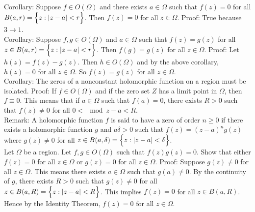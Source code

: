 \documentclass[12pt]{article}
\begin{document}
Corollary: Suppose $f \in O(\Omega)$ and there exists $a \in \Omega$ such that $f(z) = 0$ for all $B(a,r) = \Big\{ z : \abs{z-a} < r \Big\}$. Then $f(z) = 0$ for all $z \in \Omega$. Proof: True because $3\to1$. \\
Corollary: Suppose $f,g \in O(\Omega)$ and $a \in \Omega$ such that $f(z) = g(z)$ for all $z \in B(a,r) = \Big\{ z: \abs{z-a} < r \Big\}$. Then $f(g) = g(z)$ for all $z \in \Omega$. Proof: Let $h(z) = f(z) - g(z)$. Then $h \in O(\Omega)$ and by the above corollary, $h(z) = 0$ for all $z \in \Omega$. So $f(z) = g(z)$ for all $z \in \Omega$. \\
Corollary: The zeros of a nonconstant holomorphic function on a region must be isolated. Proof: If $f \in O(\Omega)$ and if the zero set $Z$ has a limit point in $\Omega$, then $f \equiv 0$. This means that if $a \in \Omega$ such that $f(a) = 0$, there exists $R > 0$ such that $f(z) \neq 0$ for all $0 < \mod{z-a} < R$. \\
Remark: A holomorphic function $f$ is said to have a zero of order $n \geq 0$ if there exists a holomorphic function $g$ and $a\delta > 0$ such that $f(z) = (z-a)^ng(z)$ where $g(z) \neq 0$ for all $z \in B(a,\delta) = \Big\{ z: \abs{z-a} < \delta \Big\}$. \\
Let $\Omega$ be a region. Let $f,g \in O(\Omega)$ such that $f(z)g(z) = 0$. Show that either $f(z) = 0$ for all $z \in \Omega$ or $g(z) = 0$ for all $z \in \Omega$. Proof: Suppose $g(z) \neq 0$ for all $z \in \Omega$. This means there exists $a \in \Omega$ such that $g(a) \neq 0$. By the continuity of $g$, there exists $R > 0$ such that $g(z) \neq 0$ for all $z \in B(a,R) = \Big\{ z: \abs{z-a} < R \Big\}$. This implies $f(z) = 0$ for all $z \in B(a,R)$. Hence by the Identity Theorem, $f(z) = 0$ for all $z \in \Omega$. 
\end{document}
